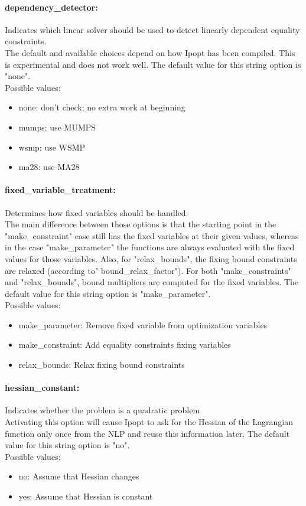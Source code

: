 \paragraph{dependency\_detector:}\label{sec:dependency_detector} Indicates which linear solver should be used to detect linearly dependent equality constraints. $\;$ \\
 The default and available choices depend on how
Ipopt has been compiled.  This is experimental
and does not work well.
The default value for this string option is "none".
\\ 
Possible values:
\begin{itemize}
   \item none: don't check; no extra work at beginning
   \item mumps: use MUMPS
   \item wsmp: use WSMP
   \item ma28: use MA28
\end{itemize}

\paragraph{fixed\_variable\_treatment:}\label{sec:fixed_variable_treatment} Determines how fixed variables should be handled. $\;$ \\
 The main difference between those options is that
the starting point in the "make\_constraint" case
still has the fixed variables at their given
values, whereas in the case "make\_parameter" the
functions are always evaluated with the fixed
values for those variables.  Also, for
"relax\_bounds", the fixing bound constraints are
relaxed (according to" bound\_relax\_factor").
For both "make\_constraints" and "relax\_bounds",
bound multipliers are computed for the fixed
variables.
The default value for this string option is "make\_parameter".
\\ 
Possible values:
\begin{itemize}
   \item make\_parameter: Remove fixed variable from optimization
variables
   \item make\_constraint: Add equality constraints fixing variables
   \item relax\_bounds: Relax fixing bound constraints
\end{itemize}

\paragraph{hessian\_constant:}\label{sec:hessian_constant} Indicates whether the problem is a quadratic problem $\;$ \\
 Activating this option will cause Ipopt to ask
for the Hessian of the Lagrangian function only
once from the NLP and reuse this information
later.
The default value for this string option is "no".
\\ 
Possible values:
\begin{itemize}
   \item no: Assume that Hessian changes
   \item yes: Assume that Hessian is constant
\end{itemize}

